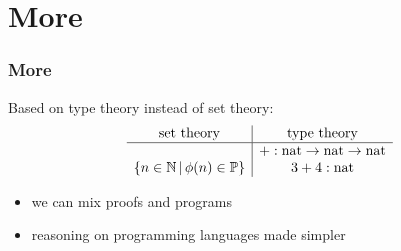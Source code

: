 \section{More}
\begin{frame}
  \frametitle{More}
  Based on type theory instead of set theory:
  \[
    \begin{array}{c|c}
      \mathrm{set\ theory} & \mathrm{type\ theory}\\
      \hline
      & + : \mathrm{nat} \rightarrow \mathrm{nat} \rightarrow \mathrm{nat}\\
      \{ n \in \mathbb{N}\,|\, \phi(n) \in \mathbb{P}\} & 3 + 4 : \mathrm{nat}
    \end{array}
  \]

  \begin{itemize}
    \item we can mix proofs and programs
    \item reasoning on programming languages made simpler
  \end{itemize}
\end{frame}



